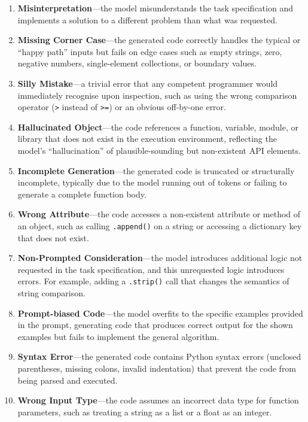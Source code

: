 \documentclass[smallextended]{svjour3}
\begin{document}
\begin{enumerate}
    \item \textbf{Misinterpretation}---the model misunderstands the task specification and implements a solution to a different problem than what was requested.
    \item \textbf{Missing Corner Case}---the generated code correctly handles the typical or ``happy path'' inputs but fails on edge cases such as empty strings, zero, negative numbers, single-element collections, or boundary values.
    \item \textbf{Silly Mistake}---a trivial error that any competent programmer would immediately recognise upon inspection, such as using the wrong comparison operator (\texttt{>} instead of \texttt{>=}) or an obvious off-by-one error.
    \item \textbf{Hallucinated Object}---the code references a function, variable, module, or library that does not exist in the execution environment, reflecting the model's ``hallucination'' of plausible-sounding but non-existent API elements.
    \item \textbf{Incomplete Generation}---the generated code is truncated or structurally incomplete, typically due to the model running out of tokens or failing to generate a complete function body.
    \item \textbf{Wrong Attribute}---the code accesses a non-existent attribute or method of an object, such as calling \texttt{.append()} on a string or accessing a dictionary key that does not exist.
    \item \textbf{Non-Prompted Consideration}---the model introduces additional logic not requested in the task specification, and this unrequested logic introduces errors. For example, adding a \texttt{.strip()} call that changes the semantics of string comparison.
    \item \textbf{Prompt-biased Code}---the model overfits to the specific examples provided in the prompt, generating code that produces correct output for the shown examples but fails to implement the general algorithm.
    \item \textbf{Syntax Error}---the generated code contains Python syntax errors (unclosed parentheses, missing colons, invalid indentation) that prevent the code from being parsed and executed.
    \item \textbf{Wrong Input Type}---the code assumes an incorrect data type for function parameters, such as treating a string as a list or a float as an integer.
\end{enumerate}
\end{document}
